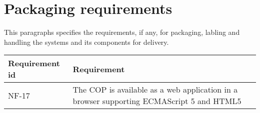 
\newpage
\section{Packaging requirements}
This paragraphs specifies the requirements, if any, for packaging, labling and handling the systems and its components for delivery.

\begin{longtable}{| p{3.2cm} |  p{10cm} | }
	\hline
	\textbf{Requirement id} &  \textbf{Requirement } \\
	\hline
	NF-17 & The COP is available as a web application in a browser supporting ECMAScript 5 and HTML5 \\
	\hline
\end{longtable}